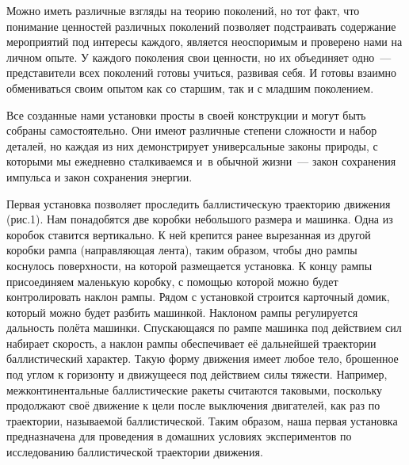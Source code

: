 Можно иметь различные взгляды на теорию поколений, но тот факт, что понимание ценностей различных поколений позволяет подстраивать содержание мероприятий под интересы каждого, является неоспоримым и проверено нами на личном опыте. У каждого поколения свои ценности, но их объединяет одно~--- представители всех поколений готовы учиться, развивая себя. И готовы взаимно обмениваться своим опытом как со старшим, так и с младшим поколением.

Все созданные нами установки просты в своей конструкции и могут быть собраны самостоятельно. Они имеют различные степени сложности и набор деталей, но каждая из них демонстрирует универсальные законы природы, с которыми мы ежедневно сталкиваемся и~в обычной жизни~--- закон сохранения импульса и закон сохранения энергии.

Первая установка позволяет проследить баллистическую траекторию движения (рис.1). Нам понадобятся две коробки небольшого размера и машинка. Одна из коробок ставится вертикально. К ней крепится ранее вырезанная из другой коробки рампа (направляющая лента), таким образом, чтобы дно рампы коснулось поверхности, на которой размещается установка.  К концу рампы присоединяем маленькую коробку, с помощью которой можно будет контролировать наклон рампы. Рядом с установкой строится карточный домик, который можно будет разбить машинкой. Наклоном рампы регулируется дальность полёта машинки. Спускающаяся по рампе машинка под действием сил набирает скорость, а наклон рампы обеспечивает её дальнейшей траектории баллистический характер. Такую форму движения имеет любое тело, брошенное под углом к горизонту и движущееся под действием силы тяжести. Например, межконтинентальные баллистические ракеты считаются таковыми, поскольку продолжают своё движение к цели после выключения двигателей, как раз по траектории, называемой баллистической. Таким образом, наша первая установка предназначена для проведения в домашних условиях экспериментов по исследованию баллистической траектории движения.



